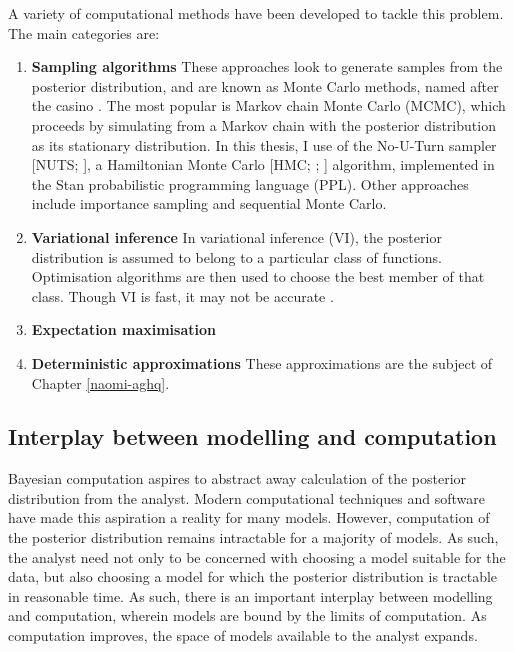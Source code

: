 \documentclass[a4paper, nobind]{templates/ociamthesis}
\providecommand{\tightlist}{%
  \setlength{\itemsep}{0pt}\setlength{\parskip}{0pt}}
\begin{document}
A variety of computational methods have been developed to tackle this problem.
The main categories are:

\begin{enumerate}
\def\labelenumi{\arabic{enumi}.}
\tightlist
\item
  \textbf{Sampling algorithms} These approaches look to generate samples from the posterior distribution, and are known as Monte Carlo methods, named after the casino \autocite{robert2005monte}.
  The most popular is Markov chain Monte Carlo (MCMC), which proceeds by simulating from a Markov chain with the posterior distribution as its stationary distribution.
  In this thesis, I use of the No-U-Turn sampler {[}NUTS; \textcite{hoffman2014no}{]}, a Hamiltonian Monte Carlo {[}HMC; \textcite{duane1987hybrid}; \textcite{neal2011mcmc}{]} algorithm, implemented in the Stan \autocite{carpenter2017stan} probabilistic programming language (PPL).
  Other approaches include importance sampling and sequential Monte Carlo.
\item
  \textbf{Variational inference} In variational inference (VI), the posterior distribution is assumed to belong to a particular class of functions.
  Optimisation algorithms are then used to choose the best member of that class.
  Though VI is fast, it may not be accurate \autocite{yao2018yes}.
\item
  \textbf{Expectation maximisation}
\item
  \textbf{Deterministic approximations} These approximations are the subject of Chapter \ref{naomi-aghq}.
\end{enumerate}

\hypertarget{interplay-between-modelling-and-computation}{%
\subsection{Interplay between modelling and computation}\label{interplay-between-modelling-and-computation}}

Bayesian computation aspires to abstract away calculation of the posterior distribution from the analyst.
Modern computational techniques and software have made this aspiration a reality for many models.
However, computation of the posterior distribution remains intractable for a majority of models.
As such, the analyst need not only to be concerned with choosing a model suitable for the data, but also choosing a model for which the posterior distribution is tractable in reasonable time.
As such, there is an important interplay between modelling and computation, wherein models are bound by the limits of computation.
As computation improves, the space of models available to the analyst expands.
\end{document}
